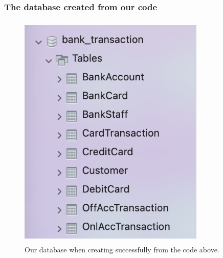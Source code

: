 \documentclass[12pt,a4paper]{article}
\begin{document}
\subsubsection{The database created from our code} 
\begin{figure}[H]
    \centering
    \includegraphics[width=3.5in,height=4.5in]{Picture/result2.png}
    \caption{Our database when creating successfully from the code above.}
\end{figure}
\end{document}
